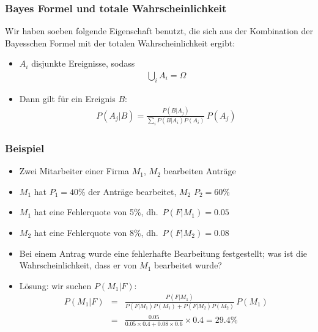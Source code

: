 \begin{frame}
  \frametitle{Bayes Formel und totale Wahrscheinlichkeit}

  Wir haben soeben folgende Eigenschaft benutzt, die sich aus der
  Kombination der Bayesschen Formel mit der totalen Wahrscheinlichkeit
  ergibt:
  \begin{itemize}
  \item $A_i$ disjunkte Ereignisse, sodass
    \begin{gather*}
      \bigcup_i A_i = \Omega
    \end{gather*}
  \item Dann gilt für ein Ereignis $B$:
    \begin{gather*}
      P(A_j|B) =  \frac{P(B|A_j)}{\sum_i P(B|A_i)P(A_i)}\,P(A_j)
    \end{gather*}
  \end{itemize}
\end{frame}

\begin{frame}
    \frametitle{Beispiel}

    \begin{itemize}
        \item Zwei Mitarbeiter einer Firma $M_1$, $M_2$ bearbeiten Anträge
        \item $M_1$ hat $P_1=40\%$ der Anträge bearbeitet, $M_2$ $P_2=60\%$
        \item $M_1$ hat eine Fehlerquote von 5\%, dh.\  $P(F|M_1)=0.05$
        \item $M_2$ hat eine Fehlerquote von 8\%, dh.\  $P(F|M_2)=0.08$
        \item Bei einem Antrag wurde eine fehlerhafte Bearbeitung festgestellt; was ist die Wahrscheinlichkeit, dass er von $M_1$ bearbeitet wurde?
        \item Lösung: wir suchen $P(M_1|F)$:
        \begin{eqnarray*}
        P(M_1|F) &=& \frac{P(F|M_1)}{P(F|M_1)P(M_1)+ P(F|M_2)P(M_2)}\,P(M_1) \\
        &=& \frac{0.05}{0.05\times 0.4 + 0.08\times 0.6}\times 0.4 = 29.4\%
        \end{eqnarray*}
    \end{itemize}
\end{frame}

